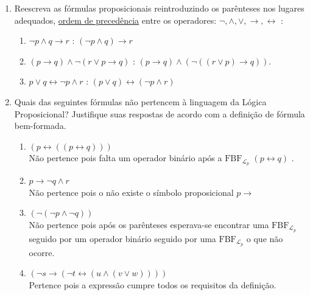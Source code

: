 \begin{enumerate}[label=\arabic*., left=0.5cm, align=left, nosep]
            \item Reescreva as fórmulas proposicionais reintroduzindo os parênteses nos lugares adequados, 
                \underline{ordem de precedência} entre os operadores: $\neg, \land, \lor, \rightarrow, \leftrightarrow$ :

                \begin{enumerate}[label=(\alph*), left=0.5cm, align=left, nosep]
                    \item $\neg p \land q \rightarrow r$ : $(\neg p \land q) \rightarrow r$ 
                    \item $(p \rightarrow q) \land \neg (r \lor p \rightarrow q)$ : $(p \rightarrow q) \land (\neg ((r \lor p) \rightarrow q))$.
                    \item $p \lor q \leftrightarrow \neg p \land r$ : $(p \lor q) \leftrightarrow (\neg p \land r)$
                \end{enumerate}    
                
            \item Quais das seguintes fórmulas não pertencem à linguagem da Lógica Proposicional? Justifique suas respostas de acordo com a definição de fórmula bem-formada.

                \begin{enumerate}[label=(\alph*), left=0.5cm, align=left, nosep]
                    \item $(p \leftrightarrow ((p \leftrightarrow q)))$ \\
                    Não pertence pois falta um operador binário após a $\mathrm{FBF}_{\mathcal{L}_p}$ $(p \leftrightarrow q)$ . 
                    \item $p \rightarrow \neg q \land r$ \\
                    Não pertence pois o não existe o símbolo proposicional $p \rightarrow$
                    \item $(\neg (\neg p \land \neg q))$ \\
                    Não pertence pois após os parênteses esperava-se encontrar uma $\mathrm{FBF}_{\mathcal{L}_p}$ seguido 
                    por um operador binário seguido por uma $\mathrm{FBF}_{\mathcal{L}_p}$ o que não ocorre.
                    \item $(\neg s \rightarrow (\neg t \leftrightarrow (u \land (v \lor w))))$ \\
                    Pertence pois a expressão cumpre todos os requisitos da definição. 
        

\end{enumerate}
\end{enumerate}
